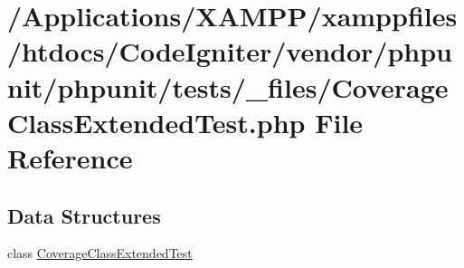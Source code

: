 \hypertarget{phpunit_2tests_2__files_2_coverage_class_extended_test_8php}{}\section{/\+Applications/\+X\+A\+M\+P\+P/xamppfiles/htdocs/\+Code\+Igniter/vendor/phpunit/phpunit/tests/\+\_\+files/\+Coverage\+Class\+Extended\+Test.php File Reference}
\label{phpunit_2tests_2__files_2_coverage_class_extended_test_8php}
\subsection*{Data Structures}
\begin{DoxyCompactItemize}
\item 
class \mbox{\hyperlink{class_coverage_class_extended_test}{Coverage\+Class\+Extended\+Test}}
\end{DoxyCompactItemize}
